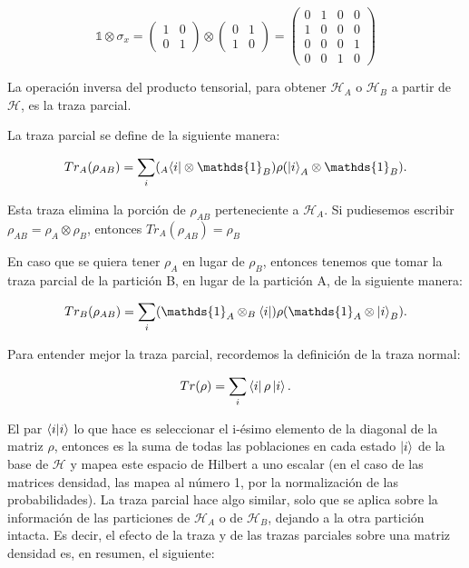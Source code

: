 \begin{equation*}
    \mathds{1} \otimes \sigma_x
    = \begin{pmatrix}
        1 & 0 \\
        0 & 1
        \end{pmatrix} \otimes
        \begin{pmatrix}
            0 & 1 \\
            1 & 0
        \end{pmatrix}
    = \begin{pmatrix}
        0 & 1 & 0 & 0 \\
        1 & 0 & 0 & 0 \\
        0 & 0 & 0 & 1 \\
        0 & 0 & 1 & 0
    \end{pmatrix}
\end{equation*}

La operación inversa del producto tensorial, para obtener $\mathcal{H}_A$ o $\mathcal{H}_B$ a partir de $\mathcal{H}$, es la traza parcial.

La traza parcial se define de la siguiente manera:

\begin{equation}
    Tr_A(\rho_{A B}) = \sum\limits_i (_A\bra{i} \otimes \mathds{1}_B) \rho (\ket{i}_A \otimes \mathds{1}_B) .
\end{equation}

Esta traza elimina la porción de $\rho_{A B}$ perteneciente a $\mathcal{H}_A$. Si pudiesemos escribir $\rho_{A B} = \rho_A \otimes \rho_B$, entonces $Tr_A(\rho_{A B}) = \rho_B$

En caso que se quiera tener $\rho_A$ en lugar de $\rho_B$, entonces tenemos que tomar la traza parcial de la partición B, en lugar de la partición A, de la siguiente manera:

\begin{equation}
    Tr_B(\rho_{A B}) = \sum\limits_i (\mathds{1}_A \otimes _B\bra{i}) \rho (\mathds{1}_A \otimes \ket{i}_B) .
\end{equation}

Para entender mejor la traza parcial, recordemos la definición de la traza normal:

\begin{equation}
    Tr(\rho) = \sum\limits_i \bra{i} \rho \ket{i} .
\end{equation}

El par $\bra{i} \ket{i}$ lo que hace es seleccionar el i-ésimo elemento de la diagonal de la matriz $\rho$, entonces es la suma de todas las poblaciones en cada estado $\ket{i}$ de la base de $\mathcal{H}$ y mapea este espacio de Hilbert a uno escalar (en el caso de las matrices densidad, las mapea al número 1, por la normalización de las probabilidades). La traza parcial hace algo similar, solo que se aplica sobre la información de las particiones de $\mathcal{H}_A$ o de $\mathcal{H}_B$, dejando a la otra partición intacta. Es decir, el efecto de la traza y de las trazas parciales sobre una matriz densidad es, en resumen, el siguiente:

